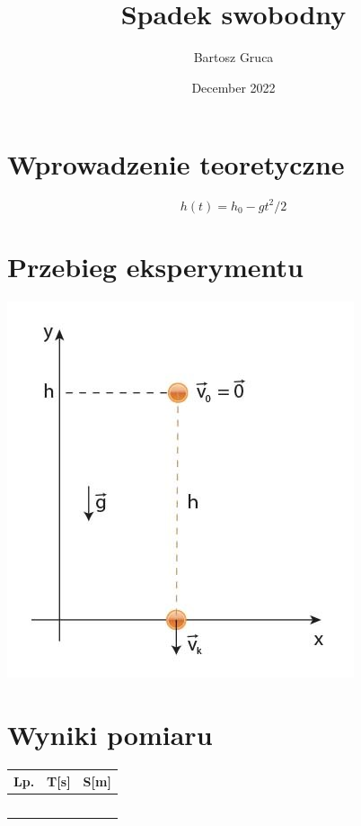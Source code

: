 \documentclass{article}
\title{Spadek swobodny}
\author{Bartosz Gruca}
\date{December 2022}
\begin{document}
\maketitle

\section{Wprowadzenie teoretyczne}

\begin{equation}
    h(t)=h_0- gt^2/2
\end{equation}

\section{Przebieg eksperymentu}

\begin{center}
\includegraphics[scale=0.5]{zdj.jpg}
\end{center}

\section{Wyniki pomiaru}

\begin{center}
\begin{tabular}{ |p{1cm}|p{5cm}|p{5cm}| }
\hline
  Lp. & T[s] & S[m]  \\ 
    \hline
  &  &   \\ 
    \hline
  &  &   \\ 
    \hline
  &  &   \\ 
    \hline
  &  &   \\ 
    \hline
  &  &   \\  
\hline
\end{tabular}
\end{center}
\end{document}
